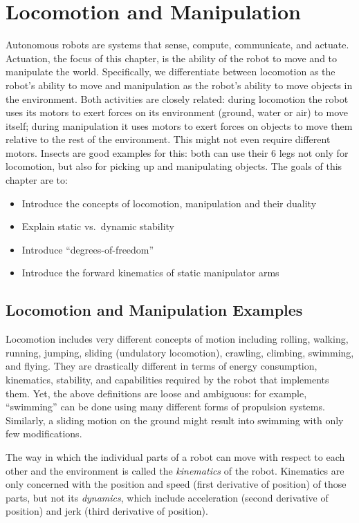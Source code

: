 \chapter{Locomotion and Manipulation}\label{chap:locomotion}
Autonomous robots are systems that sense, compute, communicate, and actuate. Actuation, the focus of this chapter, is the ability of the robot to move and to manipulate the world. Specifically, we differentiate between locomotion as the robot's ability to move and manipulation as the robot's ability to move objects in the environment. Both activities are closely related: during locomotion the robot uses its motors to exert forces on its environment (ground, water or air) to move itself; during manipulation it uses motors to exert forces on objects to move them relative to the rest of the environment. This might not even require different motors. Insects are good examples for this: both can use their 6 legs not only for locomotion, but also for picking up and manipulating objects. The goals of this chapter are to:
\begin{itemize}
\item Introduce the concepts of locomotion, manipulation and their duality
\item Explain static vs.\ dynamic stability
\item Introduce ``degrees-of-freedom''
\item Introduce the forward kinematics of static manipulator arms
\end{itemize}

\section{Locomotion and Manipulation Examples}

Locomotion includes very different concepts of motion including rolling, walking, running, jumping, sliding (undulatory locomotion), crawling, climbing, swimming, and flying. They are drastically different in terms of energy consumption, kinematics, stability, and capabilities required by the robot that implements them. Yet, the above definitions are loose and ambiguous: for example, ``swimming'' can be done using many different forms of propulsion systems. Similarly, a sliding motion on the ground might result into swimming with only few modifications.

The way in which the individual parts of a robot can move with respect to each other and the environment is called the \textsl{kinematics} of the robot. Kinematics are only concerned with the position and speed (first derivative of position) of those parts, but not its \textsl{dynamics}, which include acceleration (second derivative of position) and jerk (third derivative of position).

